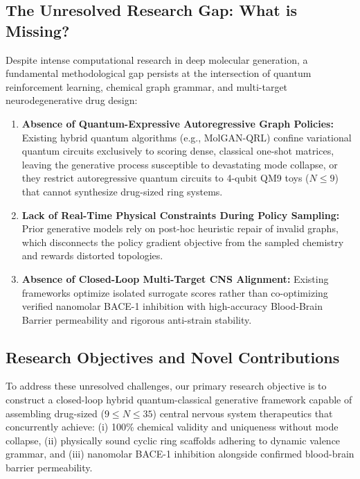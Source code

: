 \documentclass[10pt,a4paper]{article}
\begin{document}
\subsection{The Unresolved Research Gap: What is Missing?}
Despite intense computational research in deep molecular generation, a fundamental methodological gap persists at the intersection of quantum reinforcement learning, chemical graph grammar, and multi-target neurodegenerative drug design:
\begin{enumerate}[noitemsep]
    \item \textbf{Absence of Quantum-Expressive Autoregressive Graph Policies:} Existing hybrid quantum algorithms (e.g., MolGAN-QRL) confine variational quantum circuits exclusively to scoring dense, classical one-shot matrices, leaving the generative process susceptible to devastating mode collapse, or they restrict autoregressive quantum circuits to 4-qubit QM9 toys ($N \le 9$) that cannot synthesize drug-sized ring systems.
    \item \textbf{Lack of Real-Time Physical Constraints During Policy Sampling:} Prior generative models rely on post-hoc heuristic repair of invalid graphs, which disconnects the policy gradient objective from the sampled chemistry and rewards distorted topologies.
    \item \textbf{Absence of Closed-Loop Multi-Target CNS Alignment:} Existing frameworks optimize isolated surrogate scores rather than co-optimizing verified nanomolar BACE-1 inhibition with high-accuracy Blood-Brain Barrier permeability and rigorous anti-strain stability.
\end{enumerate}

\subsection{Research Objectives and Novel Contributions}
To address these unresolved challenges, our primary research objective is to construct a closed-loop hybrid quantum-classical generative framework capable of assembling drug-sized ($9 \le N \le 35$) central nervous system therapeutics that concurrently achieve: (i) 100\% chemical validity and uniqueness without mode collapse, (ii) physically sound cyclic ring scaffolds adhering to dynamic valence grammar, and (iii) nanomolar BACE-1 inhibition alongside confirmed blood-brain barrier permeability. 
\end{document}

